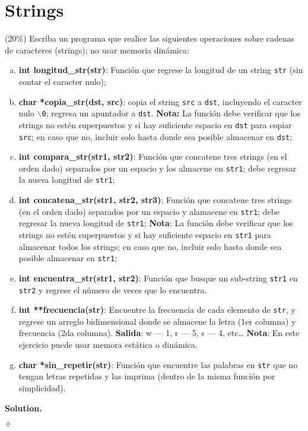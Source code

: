\documentclass{article}
\theoremstyle{problemstyle}
\newenvironment{solution}{%
  \begin{mdframed}[linewidth=0.8pt,linecolor=Gray,backgroundcolor=Gray!5,roundcorner=5pt, nobreak=true]%
  \noindent\textbf{Solution.}%
}{%
\hfill $ \diamond $ 
  \end{mdframed}%
}
\begin{document}
\section*{Strings}\label{sec:strings} %

\begin{problem}
(20\%) Escriba un programa que realice las siguientes operaciones sobre cadenas de caracteres (strings); no usar memoria din\'amica:
\begin{enumerate}[a)]
	\item \textbf{int longitud\_str(str)}: Funci\'on que regrese la longitud de un string \texttt{str} (sin contar el caracter nulo);
	\item \textbf{char *copia\_str(dst, src)}: copia el string \texttt{src} a \texttt{dst}, incluyendo el caracter nulo $\backslash$\texttt{0}; regresa un apuntador a \texttt{dst}.
	      \textbf{Nota:} La funci\'on debe verificar que los strings no est\'en superpuestos y si hay suficiente espacio en \texttt{dst} para copiar \texttt{src}; en caso que no, incluir solo hasta donde sea posible almacenar en \texttt{dst};
	\item \textbf{int compara\_str(str1, str2)}: Funci\'on que concatene tres strings (en el orden dado) separados por un espacio y los almacene en \texttt{str1}; debe regresar la nueva longitud de \texttt{str1};
	\item \textbf{int concatena\_str(str1, str2, str3)}: Funci\'on que concatene tres strings (en el orden dado) separados por un espacio y alamacene en \texttt{str1}; debe regresar la nueva longitud de \texttt{str1};
	      \textbf{Nota}: La funci\'on debe verificar que los strings no est\'en superpuestos y si hay suficiente espacio en \texttt{str1} para almacenar todos los strings; en caso que no, incluir solo hasta donde sea posible almacenar en \texttt{str1};
	\item \textbf{int encuentra\_str(str1, str2)}: Funci\'on que busque un sub-string \texttt{str1} en \texttt{str2} y regrese el n\'umero de veces que lo encuentra.
	\item \textbf{int **frecuencia(str)}: Encuentre la frecuencia de cada elemento de \texttt{str}, y regrese un arreglo bidimensional donde se almacene la letra (1er columna) y frecuencia (2da columna).
	      \textbf{Salida}: w --- 1, r --- 5, s --- 4, etc\dots
	      \textbf{Nota}: En este ejercicio puede usar memora est\'atica o din\'amica.

	\item \textbf{char *sin\_repetir(str)}: Funci\'on que encuentre las palabras en \texttt{str} que no tengan letras repetidas y las imprima (dentro de la misma funci\'on por simplicidad).
\end{enumerate}
\end{problem}
\begin{solution}

\end{solution}
\end{document}
